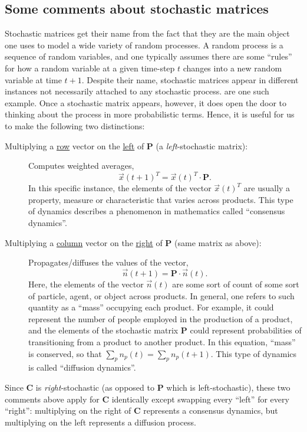 \documentclass[12pt]{article}
\newcommand{\mtx}[1]{\mathbf{ #1}}
\begin{document}
\subsection{Some comments about stochastic matrices}
Stochastic matrices get their name from the fact that they are the main object one uses to model a wide variety of random processes. A random process is a sequence of random variables, and one typically assumes there are some ``rules'' for how a random variable at a given time-step $t$ changes into a new random variable at time $t+1$. Despite their name, stochastic matrices appear in different instances not necessarily attached to any stochastic process.  are one such example. Once a stochastic matrix appears, however, it does open the door to thinking about the process in more probabilistic terms. Hence, it is useful for us to make the following two distinctions:
\begin{description}
	\item[Multiplying a \underline{row} vector on the \underline{left} of $\mtx{P}$ (a \emph{left}-stochastic matrix):] 
	Computes weighted averages, $$\vec{x}(t+1)^T = \vec{x}(t)^T\cdot\mtx{P}.$$
	In this specific instance, the elements of the vector $\vec{x}(t)^T$ are usually a property, measure or characteristic that varies across products. This type of dynamics describes a phenomenon in mathematics called ``consensus dynamics''.
	\item[Multiplying a \underline{column} vector on the \underline{right} of $\mtx{P}$ (same matrix as above):] 
	Propagates/diffuses the values of the vector, $$\vec{n}(t+1) = \mtx{P}\cdot\vec{n}(t).$$
	Here, the elements of the vector $\vec{n}(t)$ are some sort of count of some sort of particle, agent, or object across products. In general, one refers to such quantity as a ``mass'' occupying each product. For example, it could represent the number of people employed in the production of a product, and the elements of the stochastic matrix $\mtx{P}$ could represent probabilities of transitioning from a product to another product. In this equation, ``mass'' is conserved, so that $\sum_p n_p(t) = \sum_p n_p(t+1)$. This type of dynamics is called ``diffusion dynamics''.
\end{description}
Since $\mtx{C}$ is \emph{right}-stochastic (as opposed to $\mtx{P}$ which is left-stochastic), these two comments above apply for $\mtx{C}$ identically except swapping every ``left'' for every ``right'': multiplying on the right of $\mtx{C}$ represents a consensus dynamics, but multiplying on the left represents a diffusion process.
\end{document}
